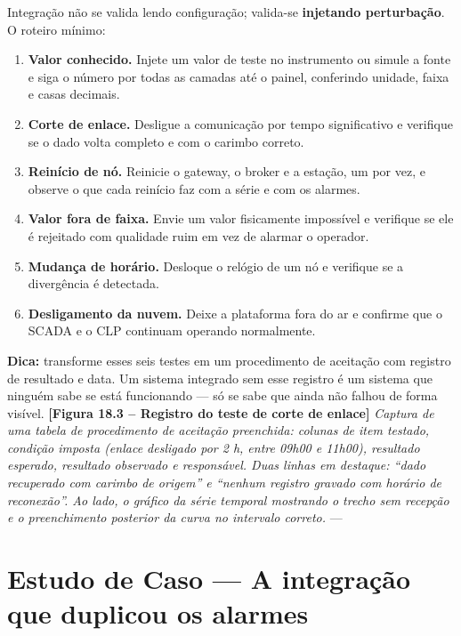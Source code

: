 Integração não se valida lendo configuração; valida-se \textbf{injetando perturbação}. O roteiro mínimo:

\begin{enumerate}
\def\labelenumi{\arabic{enumi}.}
\tightlist
\item
  \textbf{Valor conhecido.} Injete um valor de teste no instrumento ou simule a fonte e siga o número por
  todas as camadas até o painel, conferindo unidade, faixa e casas decimais.
\item
  \textbf{Corte de enlace.} Desligue a comunicação por tempo significativo e verifique se o dado volta
  completo e com o carimbo correto.
\item
  \textbf{Reinício de nó.} Reinicie o gateway, o broker e a estação, um por vez, e observe o que cada
  reinício faz com a série e com os alarmes.
\item
  \textbf{Valor fora de faixa.} Envie um valor fisicamente impossível e verifique se ele é rejeitado com
  qualidade ruim em vez de alarmar o operador.
\item
  \textbf{Mudança de horário.} Desloque o relógio de um nó e verifique se a divergência é detectada.
\item
  \textbf{Desligamento da nuvem.} Deixe a plataforma fora do ar e confirme que o SCADA e o CLP continuam
  operando normalmente.
\end{enumerate}

\begin{caixadica}

\textbf{Dica:} transforme esses seis testes em um procedimento de aceitação com registro de resultado
e data. Um sistema integrado sem esse registro é um sistema que ninguém sabe se está funcionando ---
só se sabe que ainda não falhou de forma visível.
\textbf{{[}Figura 18.3 -- Registro do teste de corte de enlace{]}}
\emph{Captura de uma tabela de procedimento de aceitação preenchida: colunas de item testado, condição imposta (enlace desligado por 2 h, entre 09h00 e 11h00), resultado esperado, resultado observado e responsável. Duas linhas em destaque: ``dado recuperado com carimbo de origem'' e ``nenhum registro gravado com horário de reconexão''. Ao lado, o gráfico da série temporal mostrando o trecho sem recepção e o preenchimento posterior da curva no intervalo correto.}
---

\end{caixadica}

\section{\texorpdfstring{Estudo de Caso --- A integração que duplicou os alarmes}{Estudo de Caso  A integração que duplicou os alarmes}}\label{estudo-de-caso-a-integrauxe7uxe3o-que-duplicou-os-alarmes}

